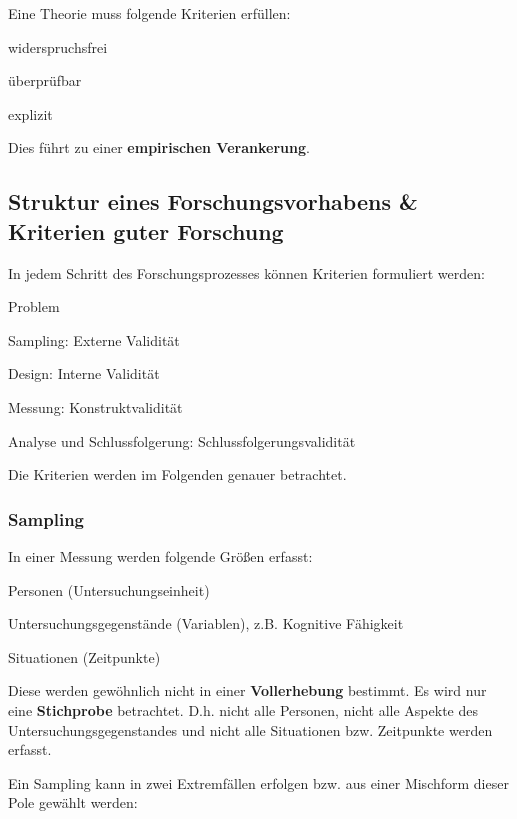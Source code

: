 \documentclass{article}
\numberwithin{equation}{section}
\begin{document}
Eine Theorie muss folgende Kriterien erfüllen:

\begin{compactenum}
\item widerspruchsfrei
\item überprüfbar
\item explizit
\end{compactenum}

Dies führt zu einer \textbf{empirischen Verankerung}.

\subsection{Struktur eines Forschungsvorhabens \& Kriterien guter Forschung}

In jedem Schritt des Forschungsprozesses können Kriterien formuliert werden:

\begin{compactitem}
\item Problem
\item Sampling: Externe Validität
\item Design: Interne Validität
\item Messung: Konstruktvalidität
\item Analyse und Schlussfolgerung: Schlussfolgerungsvalidität
\end{compactitem}

Die Kriterien werden im Folgenden genauer betrachtet.

\subsubsection{Sampling}

In einer Messung werden folgende Größen erfasst:

\begin{compactitem}
\item Personen (Untersuchungseinheit)
\item Untersuchungsgegenstände (Variablen), z.B. Kognitive Fähigkeit
\item Situationen (Zeitpunkte)
\end{compactitem}

Diese werden gewöhnlich nicht in einer \textbf{Vollerhebung} bestimmt. Es wird nur eine \textbf{Stichprobe} betrachtet. D.h. nicht alle Personen, nicht alle Aspekte des Untersuchungsgegenstandes und nicht alle Situationen bzw. Zeitpunkte werden erfasst.

Ein Sampling kann in zwei Extremfällen erfolgen bzw. aus einer Mischform dieser Pole gewählt werden:
\end{document}
